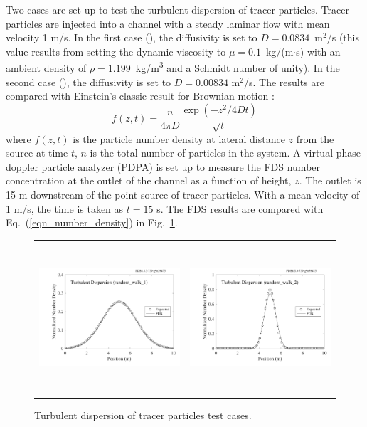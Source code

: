 \documentclass[11pt]{book}
\begin{document}
Two cases are set up to test the turbulent dispersion of tracer particles.  Tracer particles are injected into a channel with a steady laminar flow with mean velocity 1 m/s.  In the first case (), the diffusivity is set to $D=0.0834$~m$^2$/s (this value results from setting the dynamic viscosity to $\mu = 0.1$~kg/(m$\cdot$s) with an ambient density of $\rho=1.199$~\si{kg/m^3} and a Schmidt number of unity).  In the second case (), the diffusivity is set to $D=0.00834$ m$^2$/s.  The results are compared with Einstein's classic result for Brownian motion \cite{Gardiner:2004}:
\begin{equation}
\label{eqn_number_density}
f(z,t) = \frac{n}{4\pi D} \frac{\exp \left( -z^2/4Dt \right)}{\sqrt{t}}
\end{equation}
where $f(z,t)$ is the particle number density at lateral distance $z$ from the source at time $t$, $n$ is the total number of particles in the system.  A virtual phase doppler particle analyzer (PDPA) is set up to measure the FDS number concentration at the outlet of the channel as a function of height, $z$.  The outlet is 15 m downstream of the point source of tracer particles.  With a mean velocity of 1 m/s, the time is taken as $t = 15$ s.  The FDS results are compared with Eq.~(\ref{eqn_number_density}) in Fig.~\ref{random_walk_fig}.

\begin{figure}[ht]
\begin{tabular*}{\textwidth}{lr}
\includegraphics[height=2.2in]{SCRIPT_FIGURES/random_walk_1} &
\includegraphics[height=2.2in]{SCRIPT_FIGURES/random_walk_2}
\end{tabular*}
\caption[Turbulent dispersion of tracer particles]{Turbulent dispersion of tracer particles  test cases.}
\label{random_walk_fig}
\end{figure}
\end{document}
